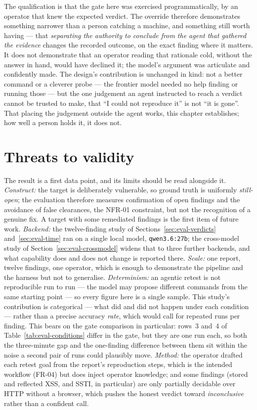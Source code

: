 The qualification is that the gate here was exercised programmatically, by an operator
that knew the expected verdict. The override therefore demonstrates something
narrower than a person catching a machine, and something still worth having --- that
\emph{separating the authority to conclude from the agent that gathered the evidence}
changes the recorded outcome, on the exact finding where it matters. It does not
demonstrate that an operator reading that rationale cold, without the answer in hand,
would have declined it; the model's argument was articulate and confidently made. The
design's contribution is unchanged in kind: not a better command or a cleverer probe ---
the frontier model needed no help finding or running those --- but the one judgement an
agent instructed to reach a verdict cannot be trusted to make, that ``I could not
reproduce it'' is not ``it is gone''. That placing the judgement outside the agent works,
this chapter establishes; how well a person holds it, it does not.

\section{Threats to validity}
\label{sec:eval-threats}

The result is a first data point, and its limits should be read alongside it.
\emph{Construct:} the target is deliberately vulnerable, so ground truth is
uniformly \emph{still-open}; the evaluation therefore measures confirmation of open
findings and the avoidance of false clearances, the NFR-01 constraint, but not
the recognition of a genuine fix. A target with some remediated findings is the first
item of future work. \emph{Backend:} the twelve-finding study of
Sections~\ref{sec:eval-verdicts} and~\ref{sec:eval-time} ran on a single local model,
\texttt{qwen3.6:27b}; the cross-model study of Section~\ref{sec:eval-crossmodel} widens
that to three further backends, and what capability does and does not change is reported
there. \emph{Scale:} one report, twelve findings,
one operator, which is enough to demonstrate the pipeline and the harness but not to
generalise. \emph{Determinism:} an agentic retest is not reproducible run to run --- the
model may propose different commands from the same starting point --- so every figure
here is a single sample. This study's contribution is categorical --- what did and did
not happen under each condition --- rather than a precise accuracy \emph{rate}, which
would call for repeated runs per finding. This bears on the gate comparison in particular:
rows~3 and~4 of Table~\ref{tab:eval-conditions} differ in the gate, but they are one run
each, so both the three-minute gap and the one-finding difference between them sit within
the noise a second pair of runs could plausibly move. \emph{Method:}
the operator drafted each retest goal from the report's reproduction steps, which is
the intended workflow (FR-04) but does inject operator knowledge; and some findings
(stored and reflected XSS, and SSTI, in particular) are only partially decidable over
HTTP without a browser, which pushes the honest verdict toward \emph{inconclusive}
rather than a confident call.

